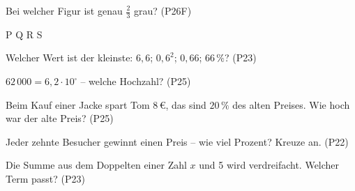 \documentclass[11pt]{article}
\begin{document}
\small

\begin{aufgabe}{Bei welcher Figur ist genau $\frac{2}{3}$ grau? \hfill (P26F) \\    }

P  \quad Q  \quad R  \quad S 
\end{aufgabe}

\begin{aufgabe}{Welcher Wert ist der kleinste: $6{,}6$; $0{,}6^2$; $0{,}66$; $66\,\%$? \hfill (P23) \\ \leerfeld}
\end{aufgabe}

\begin{aufgabe}{$62\,000 = 6{,}2 \cdot 10^{\square}$ – welche Hochzahl? \hfill (P25) \\ \leerfeld}
\end{aufgabe}

\begin{aufgabe}{Beim Kauf einer Jacke spart Tom $8\,€$, das sind $20\,\%$ des alten Preises. Wie hoch war der alte Preis? \hfill (P25) \\ \leerfeld[€]}
\end{aufgabe}

\begin{aufgabe}{Jeder zehnte Besucher gewinnt einen Preis – wie viel Prozent? Kreuze an. \hfill (P22) \\    }
\end{aufgabe}

\begin{aufgabe}{Die Summe aus dem Doppelten einer Zahl $x$ und 5 wird verdreifacht. Welcher Term passt? \hfill (P23) \\    }
\end{aufgabe}
\end{document}
